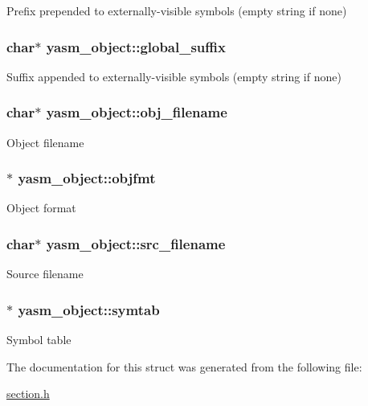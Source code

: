 Prefix prepended to externally-\/visible symbols (empty string if none) \hypertarget{structyasm__object_a7ffd29de6e1d1cf360b76410afbea5dc}{
\subsubsection[{global\-\_\-suffix}]{\setlength{\rightskip}{0pt plus 5cm}char$\ast$ yasm\-\_\-object\-::global\-\_\-suffix}}\label{structyasm__object_a7ffd29de6e1d1cf360b76410afbea5dc}
Suffix appended to externally-\/visible symbols (empty string if none) \hypertarget{structyasm__object_a8d27925b70b10101fc1894aa96c36436}{
\subsubsection[{obj\-\_\-filename}]{\setlength{\rightskip}{0pt plus 5cm}char$\ast$ yasm\-\_\-object\-::obj\-\_\-filename}}\label{structyasm__object_a8d27925b70b10101fc1894aa96c36436}
Object filename \hypertarget{structyasm__object_a968aebd8b95316a9d759561f55eb00ed}{
\subsubsection[{objfmt}]{$\ast$ yasm\-\_\-object\-::objfmt}}\label{structyasm__object_a968aebd8b95316a9d759561f55eb00ed}
Object format \hypertarget{structyasm__object_a3cca921a2a787f690d492e697d1d3fc3}{
\subsubsection[{src\-\_\-filename}]{\setlength{\rightskip}{0pt plus 5cm}char$\ast$ yasm\-\_\-object\-::src\-\_\-filename}}\label{structyasm__object_a3cca921a2a787f690d492e697d1d3fc3}
Source filename \hypertarget{structyasm__object_aeb4c1c12d801961f2700314d9d355939}{
\subsubsection[{symtab}]{$\ast$ yasm\-\_\-object\-::symtab}}\label{structyasm__object_aeb4c1c12d801961f2700314d9d355939}
Symbol table 

The documentation for this struct was generated from the following file\-:\begin{DoxyCompactItemize}
\item 
\hyperlink{section_8h}{section.\-h}\end{DoxyCompactItemize}
